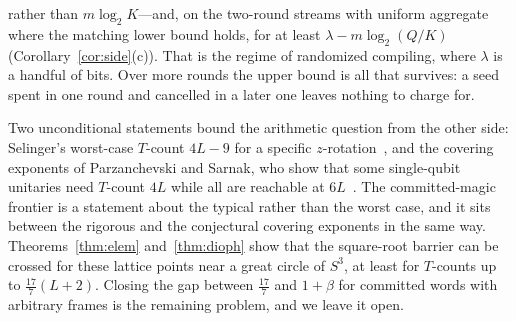 \documentclass[aps,prx,twocolumn,superscriptaddress,nofootinbib,longbibliography]{revtex4-2}
\theoremstyle{plain}
\theoremstyle{definition}
\theoremstyle{remark}
\begin{document}
rather than $m\log_2K$---and, on the two-round streams with uniform aggregate where the matching lower bound holds, for at least $\lambda-m\log_2(Q/K)$ (Corollary~\ref{cor:side}(c)). That is the regime of randomized compiling, where $\lambda$ is a handful of bits. Over more rounds the upper bound is all that survives: a seed spent in one round and cancelled in a later one leaves nothing to charge for.

Two unconditional statements bound the arithmetic question from the other side: Selinger's worst-case $T$-count $4L-9$ for a specific $z$-rotation~\cite[Thm.~30]{Selinger15}, and the covering exponents of Parzanchevski and Sarnak, who show that some single-qubit unitaries need $T$-count $4L$ while all are reachable at $6L$~\cite{PS18}. The committed-magic frontier is a statement about the typical rather than the worst case, and it sits between the rigorous and the conjectural covering exponents in the same way. Theorems~\ref{thm:elem} and~\ref{thm:dioph} show that the square-root barrier can be crossed for these lattice points near a great circle of $S^3$, at least for $T$-counts up to $\tfrac{17}7(L+2)$. Closing the gap between $\tfrac{17}7$ and $1+\beta$ for committed words with arbitrary frames is the remaining problem, and we leave it open.
\end{document}
